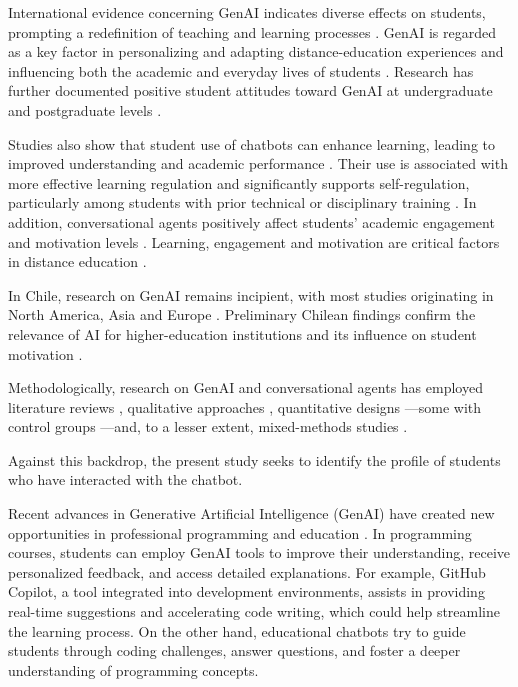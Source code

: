 \documentclass[sn-apa]{sn-jnl} %
\begin{document}
International evidence concerning GenAI indicates diverse effects on students,
prompting a redefinition of teaching and learning processes  \citep{Bahroun23}.
GenAI is regarded as a key factor in personalizing and adapting
distance-education experiences \citep{Essa23, Ilic23, Kadaruddin23} and
influencing both the academic and everyday lives of students
\citep{Chen20Review}. Research has further documented positive student
attitudes toward GenAI at undergraduate and postgraduate levels  \citep{chan23}.

Studies also show that student use of chatbots can enhance learning, leading to
improved understanding and academic performance \citep{Callejo24,Lo24}. Their
use is associated with more effective learning regulation \citep{Baha24} and
significantly supports self-regulation, particularly among students with prior
technical or disciplinary training \citep{Xia23}. In addition, conversational
agents positively affect students’ academic engagement \citep{Lo24} and
motivation levels \citep{Cubillos25}. Learning, engagement and motivation are
critical factors in distance education \citep{Abdelghani23}.

In Chile, research on GenAI remains incipient, with most studies originating in
North America, Asia and Europe \citep{Rivadeneira24}. Preliminary Chilean
findings \citep{Romero24} confirm the relevance of AI for higher-education
institutions \citep{GonzalezCampos24} and its influence on student motivation
\citep{Cubillos25}.


Methodologically, research on GenAI and conversational agents has employed
literature reviews \citep{Anchapaxi24, Choque23, Dempere23, GarciaSanchez23,
Labadze23, Lo24, Romero24}, qualitative approaches \citep{GonzalezCampos24,
Kadaruddin23, MoranOrtega24, Stone23}, quantitative designs
\citep{Carrasco24, chan23, Cherrez24}—some with control groups
\citep{Baha24, Cubillos25, Vazquez21}—and, to a lesser extent, mixed-methods
studies \citep{Polakova24}.

Against this backdrop, the present study seeks to identify the profile of
students who have interacted with the chatbot.


Recent advances in Generative Artificial Intelligence (GenAI) have created new
opportunities in professional programming and education \citep{Puryear22}. In
programming courses, students can employ GenAI tools to improve their
understanding, receive personalized feedback, and access detailed explanations.
For example, GitHub Copilot, a tool integrated into development environments,
assists in providing real-time suggestions and accelerating code writing, which
could help streamline the learning process. On the other hand, educational
chatbots try to guide students through coding challenges, answer questions, and
foster a deeper understanding of programming concepts.
\end{document}
